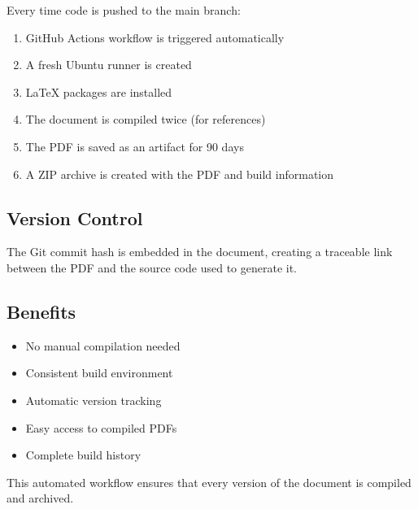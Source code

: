 \documentclass[12pt]{article}
\begin{document}
Every time code is pushed to the main branch:
\begin{enumerate}
    \item GitHub Actions workflow is triggered automatically
    \item A fresh Ubuntu runner is created
    \item LaTeX packages are installed
    \item The document is compiled twice (for references)
    \item The PDF is saved as an artifact for 90 days
    \item A ZIP archive is created with the PDF and build information
\end{enumerate}

\subsection{Version Control}

The Git commit hash is embedded in the document, creating a traceable link between the PDF and the source code used to generate it.

\subsection{Benefits}

\begin{itemize}
    \item No manual compilation needed
    \item Consistent build environment
    \item Automatic version tracking
    \item Easy access to compiled PDFs
    \item Complete build history
\end{itemize}

This automated workflow ensures that every version of the document is compiled and archived.
\end{document}
